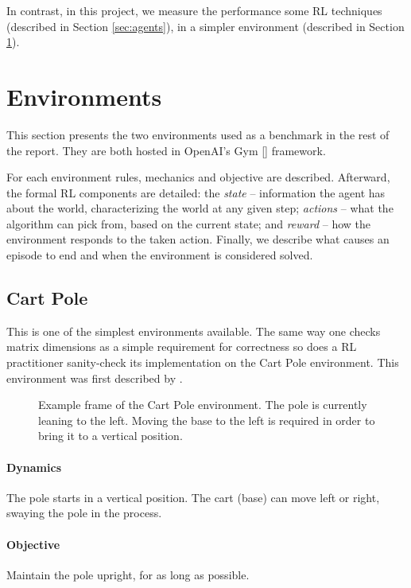 \documentclass{article}
\begin{document}
In contrast, in this project, we measure the performance some RL techniques (described in Section \ref{sec:agents}), in a simpler environment (described in Section \ref{sec:envs}).


\newpage
\section{Environments}
\label{sec:envs}
This section presents the two environments used as a benchmark in the rest of the report. They are both hosted in OpenAI's Gym [\cite{gym}] framework.

For each environment rules, mechanics and objective are described. Afterward, the formal RL components are detailed: the \textit{state} -- information the agent has about the world, characterizing the world at any given step; \textit{actions} -- what the algorithm can pick from, based on the current state; and \textit{reward} -- how the environment responds to the taken action. Finally, we describe what causes an episode to end and when the environment is considered solved.

\subsection{Cart Pole}
\label{subsec:pole}
This is one of the simplest environments available. The same way one checks matrix dimensions as a simple requirement for correctness so does a RL practitioner sanity-check its implementation on the Cart Pole environment. This environment was first described by \cite{sutton}.

\begin{figure}[!h]
\centering
  \caption{Example frame of the Cart Pole environment. The pole is currently leaning to the left. Moving the base to the left is required in order to bring it to a vertical position.}
  \label{fig:pole}
\end{figure}

\paragraph{Dynamics} The pole starts in a vertical position. The cart (base) can move left or right, swaying the pole in the process.

\paragraph{Objective} Maintain the pole upright, for as long as possible.
\end{document}
